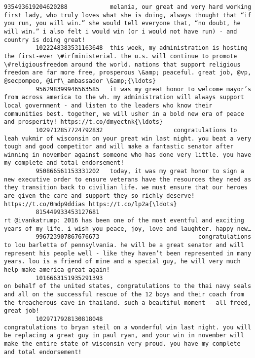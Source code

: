\documentclass[11pt]{article}
\begin{document}
\begin{Verbatim}[commandchars=\\\{\}]
         935493619204620288            melania, our great and very hard working first lady, who truly loves what she is doing, always thought that “if you run, you will win.” she would tell everyone that, “no doubt, he will win.” i also felt i would win (or i would not have run) - and country is doing great!   
         1022248383531163648  this week, my administration is hosting the first-ever \#irfministerial. the u.s. will continue to promote \#religiousfreedom around the world. nations that support religious freedom are far more free, prosperous \&amp; peaceful. great job, @vp, @secpompeo, @irf\_ambassador \&amp;{\ldots}   
         956298399946563585   it was my great honor to welcome mayor’s from across america to the wh. my administration will always support local government - and listen to the leaders who know their communities best. together, we will usher in a bold new era of peace and prosperity! https://t.co/dmyectnk{\ldots}   
         1029712857724792832                    congratulations to leah vukmir of wisconsin on your great win last night. you beat a very tough and good competitor and will make a fantastic senator after winning in november against someone who has done very little. you have my complete and total endorsement!   
         950866561153331202   today, it was my great honor to sign a new executive order to ensure veterans have the resources they need as they transition back to civilian life. we must ensure that our heroes are given the care and support they so richly deserve! https://t.co/0mdp9ddias https://t.co/lp2a{\ldots}   
         815449933453127681                                                                                                                                               rt @ivankatrump: 2016 has been one of the most eventful and exciting years of my life. i wish you peace, joy, love and laughter. happy new…   
         996723907867676673                            congratulations to lou barletta of pennsylvania. he will be a great senator and will represent his people well - like they haven’t been represented in many years. lou is a friend of mine and a special guy, he will very much help make america great again!   
         1016663151935291393                                                            on behalf of the united states, congratulations to the thai navy seals and all on the successful rescue of the 12 boys and their coach from the treacherous cave in thailand. such a beautiful moment - all freed, great job!   
         1029717928130818048                                                   congratulations to bryan steil on a wonderful win last night. you will be replacing a great guy in paul ryan, and your win in november will make the entire state of wisconsin very proud. you have my complete and total endorsement!   

\end{Verbatim}
\end{document}
